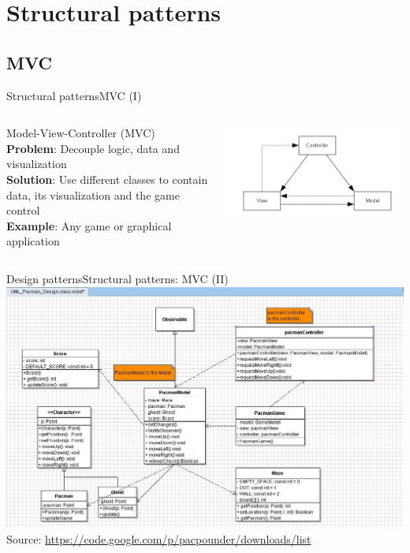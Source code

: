 \documentclass[10pt,compress]{beamer} %
\begin{document}
\section[Structural patterns]{Structural patterns}
\subsection[MVC]{MVC}

\begin{frame}[plain]{Structural patterns}{MVC (I)}
    \begin{columns}
	   \begin{block}{Model-View-Controller (MVC)}
			\textbf{Problem}: Decouple logic, data and visualization\\
			\textbf{Solution}: Use different classes to contain data, its visualization and the game control\\
			\textbf{Example}: Any game or graphical application\\
		\end{block}
			\centering\includegraphics[width=\linewidth]{figs/mvc}\\
	\end{columns}
\end{frame}

\begin{frame}{Design patterns}{Structural patterns: MVC (II)}
	\includegraphics[width=0.9\linewidth]{figs/pacman}\\
	\centering \scriptsize{Source: \url{https://code.google.com/p/pacpounder/downloads/list}}
\end{frame}
\end{document}
